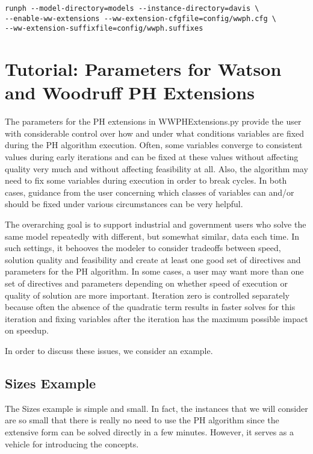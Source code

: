 \begin{verbatim}
runph --model-directory=models --instance-directory=davis \
--enable-ww-extensions --ww-extension-cfgfile=config/wwph.cfg \
--ww-extension-suffixfile=config/wwph.suffixes
\end{verbatim}


\section{Tutorial: Parameters for Watson and Woodruff PH Extensions
\label{WWTutorialSec}}

The parameters for the PH extensions in WWPHExtensions.py provide the user with
considerable control over how and under what conditions variables are fixed
during the PH algorithm execution. Often, some variables converge to consistent
values during early iterations and can be fixed at these values without
affecting quality very much and without affecting feasibility at all. Also, the
algorithm may need to fix some variables during execution in order to break
cycles. In both cases, guidance from the user concerning which classes of
variables can and/or should be fixed under various circumstances can be very
helpful.

The overarching goal is to support industrial and government users who solve the
same model repeatedly with different, but somewhat similar, data each time. In
such settings, it behooves the modeler to consider tradeoffs between speed,
solution quality and feasibility and create at least one good set of directives
and parameters for the PH algorithm. In some cases, a user may want more than
one set of directives and parameters depending on whether speed of execution or
quality of solution are more important. Iteration zero is controlled separately
because often the absence of the quadratic term results in faster solves for
this iteration and fixing variables after the iteration has the maximum possible
impact on speedup.

In order to discuss these issues, we consider an example.

\subsection{Sizes Example}

The Sizes example is simple and small. In fact, the instances that we will
consider are so small that there is really no need to use the PH algorithm since
the extensive form can be solved directly in a few minutes. However, it serves
as a vehicle for introducing the concepts.

